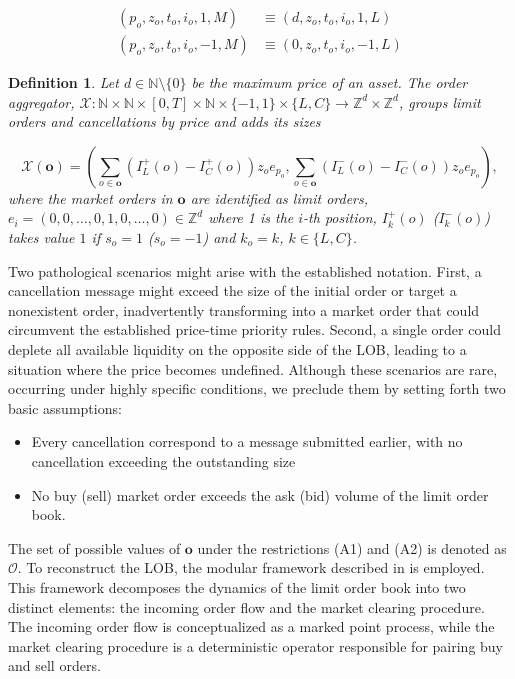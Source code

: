 \documentclass[10pt,a4paper,oneside]{article}
\newcommand{\N}{\mathbb{N}}
\newcommand{\Z}{\mathbb{Z}}
\newtheorem{definition}{Definition}
\begin{document}
\begin{align*}
    (p_o, z_o, t_o, i_o, 1,  M) &\equiv (d, z_o, t_o, i_o, 1, L) \\
    (p_o, z_o, t_o, i_o, -1, M) &\equiv (0, z_o, t_o, i_o, -1, L)
\end{align*}


\begin{definition}
Let $d \in \N \setminus \{ 0 \}$ be the maximum price of an asset. The order aggregator, $\mathcal{X} : \N \times \N \times [0, T] \times \N \times \{-1, 1 \} \times \{ L, C\} \rightarrow \Z^d \times \Z^d$, groups limit orders and cancellations by price and adds its sizes
    
$$
\mathcal{X}(\mathbf{o}) = \left( \sum_{o \in \mathbf{o}} (I^+_L(o) - I^+_C(o)) z_o e_{p_o}, \sum_{o \in \mathbf{o}} (I^-_L(o) - I^-_C(o)) z_o e_{p_o} \right),
$$
where the market orders in $\mathbf{o}$ are identified as limit orders, $e_i = (0, 0, \dots, 0, 1, 0, \dots, 0) \in \Z^d$ where 1 is the $i$-th position, $I^+_k(o)$ ($I^-_k(o)$) takes value $1$ if $s_o = 1$ ($s_o = -1$) and $k_o = k$, $k \in \{ L, C\}$.
\label{def:order_aggregator}
\end{definition}


Two pathological scenarios might arise with the established notation. First, a cancellation message might exceed the size of the initial order or target a nonexistent order, inadvertently transforming into a market order that could circumvent the established price-time priority rules. Second, a single order could deplete all available liquidity on the opposite side of the LOB, leading to a situation where the price becomes undefined. Although these scenarios are rare, occurring under highly specific conditions, we preclude them by setting forth two basic assumptions:

\begin{itemize}
    \item[(A1)] Every cancellation correspond to a message submitted earlier, with no cancellation exceeding the outstanding size 
    \item[(A2)] No buy (sell) market order exceeds the ask (bid) volume of the limit order book.
\end{itemize}

The set of possible values of $\mathbf{o}$ under the restrictions (A1) and (A2) is denoted as $\mathcal{O}$. To reconstruct the LOB, the modular framework described in \cite{cont2023mathematical} is employed. This framework decomposes the dynamics of the limit order book into two distinct elements: the incoming order flow and the market clearing procedure. The incoming order flow is conceptualized as a marked point process, while the market clearing procedure is a deterministic operator responsible for pairing buy and sell orders.
\end{document}
